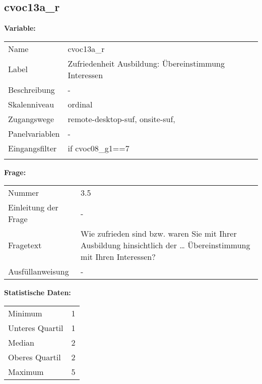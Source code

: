 	
	
	\subsection{cvoc13a\_r}
	\label{subSection:cvoc13a_r}

	\noindent\textbf{Variable:}\\
		\begin{tabular}{lL{11.3cm}}
			\label{tableVariable:cvoc13a_r}
			Name & cvoc13a\_r \\
			Label & Zufriedenheit Ausbildung: Übereinstimmung Interessen \\
			Beschreibung & - \\
			Skalenniveau & ordinal \\
			Zugangswege &
				remote-desktop-suf,
				onsite-suf,
 \\
			Panelvariablen & -
			 \\
			Eingangsfilter & if cvoc08\_g1==7 \\
 \\
		\end{tabular}

		\vspace*{1 cm}
		\noindent\textbf{Frage:}\\
		\begin{tabular}{lL{11.3cm}}
			\label{tableQuestion:cvoc13a_r}
			Nummer & 3.5 \\
			Einleitung der Frage & - \\
			Fragetext & Wie zufrieden sind bzw. waren Sie mit Ihrer Ausbildung hinsichtlich der …
Übereinstimmung mit Ihren Interessen? \\
			Ausfüllanweisung & - \\
		\end{tabular}


		\vspace*{1 cm}
		\noindent\textbf{Statistische Daten:}\\
			\begin{tabular}{ll}
				\label{tableStatistics:cvoc13a_r}
					Minimum & 1 \\
					Unteres Quartil & 1 \\
					Median & 2 \\
					Oberes Quartil & 2 \\
					Maximum & 5 \\
			\end{tabular}



